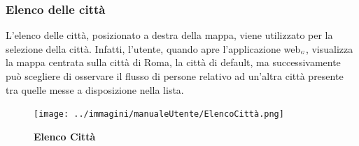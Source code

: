 \subsubsection{Elenco delle città} \label{UtilizzoDiGDPGatheringDetecionPlatformContenutoCentralePaginaInizialeHomeMenùATendina}
L'elenco delle città, posizionato a destra della mappa, viene utilizzato per la selezione della città. Infatti, l'utente, quando apre l'applicazione web$_{\scaleto{G}{3pt}}$, visualizza la mappa centrata sulla città di Roma, la città di default, ma successivamente può scegliere di osservare il flusso di persone relativo ad un'altra città presente tra quelle messe a disposizione nella lista. 
\begin{center}
	\begin{figure}[h]
		\centering\texttt{[image: ../immagini/manualeUtente/ElencoCittà.png]}
		\caption{\textbf{Elenco Città}}
	\end{figure}
\end{center}

